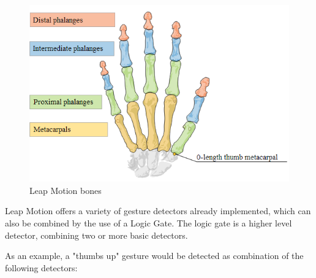 \documentclass[12pt,a4paper,twoside]{report}
\begin{document}
\begin{figure}[h]
  \centering
  \includegraphics[width=0.6\linewidth]{img/Leap_bones.png}
  \caption[]{Leap Motion bones \footnotemark}
  \label{fig:leap_bones}
\end{figure}


Leap Motion offers a variety of gesture detectors already implemented, which can also be combined by the use of a Logic Gate. The logic gate is a higher level detector, combining two or more basic detectors.

As an example, a "thumbs up" gesture would be detected as combination of the following detectors:
\end{document}
